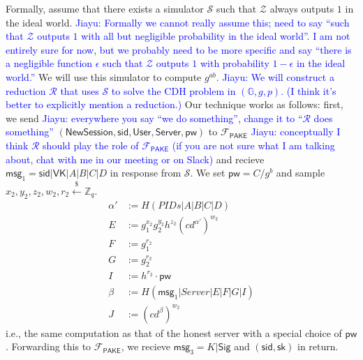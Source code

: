 \documentclass[12pt,a4paper]{article}
\newcommand{\simulator}{\mathcal{S}}
\newcommand{\env}{\mathcal{Z}}
\newcommand{\pake}{\mathcal{F}_{\mathsf{PAKE}}}
\newcommand{\user}{\mathsf{User}}
\newcommand{\sk}{\mathsf{sk}}
\newcommand{\pw}{\mathsf{pw}}
\newcommand{\newsession}{\mathsf{NewSession}}
\newcommand{\server}{\mathsf{Server}}
\newcommand{\msg}[1]{\mathsf{msg}_{#1}}
\def\xjy#1{\textcolor{blue}{Jiayu: #1}}
\begin{document}
	Formally, assume that there exists a simulator $\simulator$ such that $\env$ always outputs $1$ in the ideal world. \xjy{Formally we cannot really assume this; need to say ``such that $\env$ outputs $1$ with all but negligible probability in the ideal world''. I am not entirely sure for now, but we probably need to be more specific and say ``there is a negligible function $\epsilon$ such that $\env$ outputs $1$ with probability $1-\epsilon$ in the ideal world.''} We will use this simulator to compute $g^{ab}$. \xjy{We will construct a reduction $\mathcal{R}$ that uses $\simulator$ to solve the CDH problem in $(\mathbb{G},g,p)$. (I think it's better to explicitly mention a reduction.)} Our technique works as follows: first, we send \xjy{everywhere you say ``we do something'', change it to ``$\mathcal{R}$ does something''} $(\newsession,\mathsf{sid},\user,\server,\pw)$ to $\pake$ \xjy{conceptually I think $\mathcal{R}$ should play the role of $\pake$ (if you are not sure what I am talking about, chat with me in our meeting or on Slack)} and recieve $\msg{1} = \mathsf{sid}|\mathsf{VK}|A|B|C|D$ in response from $\simulator$. We set $\pw = C/g^b$ and sample $x_2,y_2,z_2,w_2,r_2\xleftarrow{\$}\mathbb{Z}_q$. 
	\begin{align*}
		\alpha'&:=H(PIDs|A|B|C|D)\\
		E &:= g_1^{x_2}g_2^{y_2}h^{z_2}(cd^{\alpha'})^{w_2}\\
		F &:= g_1^{r_2}\\
		G &:= g_2^{r_2}\\
		I &:= h^{r_2}\cdot\pw\\
		\beta &:= H(\msg{1}|Server|E|F|G|I)\\
		J &:= (cd^{\beta})^{w_2}
	\end{align*}
	i.e., the same computation as that of the honest server with a special choice of $\pw$. Forwarding this to $\pake$, we recieve $\msg{3}=K|\mathsf{Sig}$ and $(\mathsf{sid}, \sk)$ in return.
	
	
	
	
	
	\pagebreak
	\appendix
	
%	
%	
	
\end{document}
